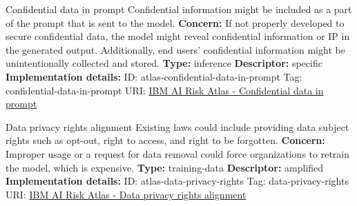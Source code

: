 \documentclass[a4paper,12pt]{article}
\begin{document}
\begin{definitionbox}{Confidential data in prompt}
Confidential information might be included as a part of the prompt that is sent to the model.\newline\newline
\textbf{Concern: }If not properly developed to secure confidential data, the model might reveal confidential information or IP in the generated output. Additionally, end users' confidential information might be unintentionally collected and stored.\newline\newline
\textbf{Type: }inference\newline
\textbf{Descriptor: }specific \newline\newline
\textbf{Implementation details: } \newline
ID: atlas-confidential-data-in-prompt \newline
Tag: confidential-data-in-prompt \newline
URI:  \href{https://www.ibm.com/docs/en/watsonx/saas?topic=SSYOK8/wsj/ai-risk-atlas/confidential-data-in-prompt.html}{IBM AI Risk Atlas - Confidential data in prompt}\newline
\end{definitionbox}
\begin{definitionbox}{Data privacy rights alignment}
Existing laws could include providing data subject rights such as opt-out, right to access, and right to be forgotten.\newline\newline
\textbf{Concern: }Improper usage or a request for data removal could force organizations to retrain the model, which is expensive.\newline\newline
\textbf{Type: }training-data\newline
\textbf{Descriptor: }amplified \newline\newline
\textbf{Implementation details: } \newline
ID: atlas-data-privacy-rights \newline
Tag: data-privacy-rights \newline
URI:  \href{https://www.ibm.com/docs/en/watsonx/saas?topic=SSYOK8/wsj/ai-risk-atlas/data-privacy-rights.html}{IBM AI Risk Atlas - Data privacy rights alignment}\newline
\end{definitionbox}
\end{document}
